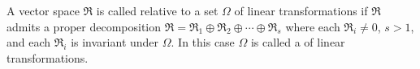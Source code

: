 A vector space $\mathfrak{R}$ is called  relative to a set $\Omega$ of linear transformations if $\mathfrak{R}$ admits a proper decomposition $\mathfrak{R} = \mathfrak{R}_1 \oplus \mathfrak{R}_2 \oplus \cdots \oplus \mathfrak{R}_s$ where each $\mathfrak{R}_i \neq 0$, $s > 1$, and each $\mathfrak{R}_i$ is invariant under $\Omega$. In this case $\Omega$ is called a  of linear transformations.
